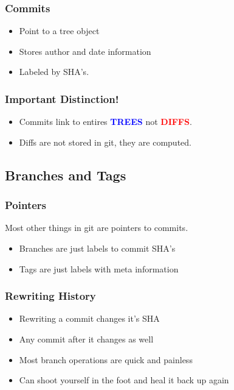 \begin{frame}
  \frametitle{Commits}
  \begin{itemize}
  \item Point to a tree object
  \item Stores author and date information
  \item Labeled by SHA's.
  \end{itemize}
\end{frame}

\begin{frame}
  \frametitle{Important Distinction!}
  \begin{itemize}
  \item Commits link to entires \textcolor{blue}{\textbf{TREES}} not
  \textcolor{red}{\textbf{DIFFS}}.
  \item Diffs are not stored in git, they are computed.
  \end{itemize}
\end{frame}

\subsection{Branches and Tags}

\begin{frame}
  \frametitle{Pointers}
  Most other things in git are pointers to commits.
  \begin{itemize}
  \item Branches are just labels to commit SHA's
  \item Tags are just labels with meta information
  \end{itemize}
\end{frame}

\begin{frame}
  \frametitle{Rewriting History}
  \begin{itemize}
  \item Rewriting a commit changes it's SHA
    \pause
  \item Any commit after it changes as well
    \pause
  \item Most branch operations are quick and painless
    \pause
  \item Can shoot yourself in the foot and heal it back up again
  \end{itemize}
\end{frame}

